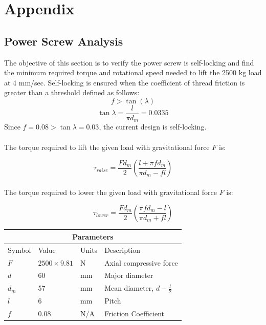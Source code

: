 \documentclass[letterpaper,12pt]{article}
\begin{document}
\newpage

\section{Appendix}

\subsection{Power Screw Analysis}

The objective of this section is to verify the power screw is self-locking and find the minimum required torque and rotational speed needed to lift the 2500 kg load at 4 mm/sec.
Self-locking is ensured when the coefficient of thread friction is greater than a threshold defined as follows:
\begin{equation}
f > \tan(\lambda)
\end{equation}
$$\tan\lambda = \frac{l}{\pi d_m} = 0.0335$$
Since $f = 0.08 > \tan\lambda = 0.03$, the current design is self-locking. \\
\\
The torque required to lift the given load with gravitational force $F$ is:

\begin{equation}
\tau_{raise} = \frac{Fd_m}{2}\left(\frac{l+\pi f d_m}{\pi d_m - fl}\right)
\end{equation}
\\
The torque required to lower the given load with gravitational force $F$ is:

\begin{equation}
\tau_{lower} = \frac{Fd_m}{2}\left(\frac{\pi f d_m-l}{\pi d_m + fl}\right)
\end{equation}


\begin{center}
	\begin{tabular}{ |p{2cm}||p{3cm}|p{2cm}|p{7cm}|  }
		\hline
		\multicolumn{4}{|c|}{Parameters} \\
		\hline
		Symbol& Value & Units & Description\\
		\hline
		$F$ & $2500 \times 9.81$ & N & Axial compressive force\\
        $d$ & 60 & mm   & Major diameter\\			
		$d_m$ & 57 & mm   & Mean diameter, $d - \frac{l}{2}$\\
		$l$ & 6 & mm &  Pitch\\
		$f$ & 0.08 & N/A & Friction Coefficient\\
		\hline
	\end{tabular}
\end{center}
\end{document}
